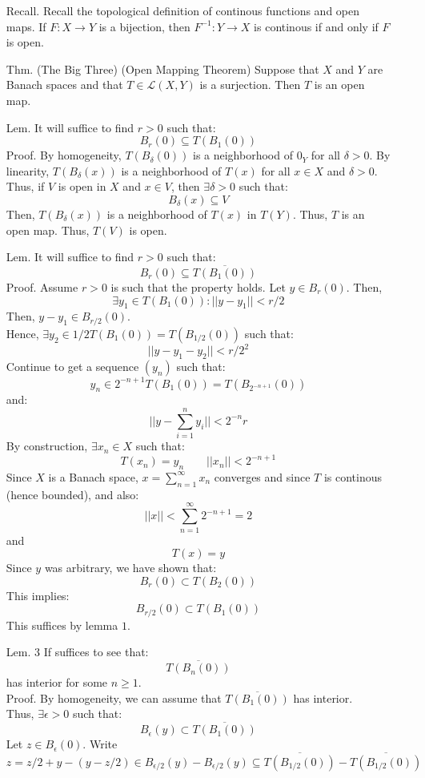 \documentclass[12pt]{article}
\begin{document}
\begin{itemize}
    \item[Recall.]  Recall the topological definition of continous functions and open maps. If $F: X\to Y$ is a bijection, then $F^{-1}: Y \to X$ is continous if and only if $F$ is open.
    \item[Thm.] (The Big Three) (Open Mapping Theorem) Suppose that $X$ and $Y$ are Banach spaces and that $T \in \mathcal{L}(X,Y)$ is a surjection. Then $T$ is an open map.
    \item[Lem.] It will suffice to find $r > 0$ such that: 
    \[ B_r(0) \subseteq T(B_1(0)) \]
    Proof. By homogeneity, $T(B_\delta(0))$ is a neighborhood of $0_Y$ for all $\delta > 0$. By linearity, $T(B_\delta(x))$ is a neighborhood of $T(x)$ for all $x \in X$ and $\delta > 0$. Thus, if $V$ is open in $X$ and $x \in V$, then $\exists \delta > 0$ such that:
    \[ B_\delta(x) \subseteq V\]
    Then, $T(B_\delta(x))$ is a neighborhood of $T(x)$ in $T(Y)$. Thus, $T$ is an open map. Thus, $T(V)$ is open.
    \item[Lem.] It will suffice to find $r > 0$ such that: 
    \[ B_r(0) \subseteq \overline{T(B_1(0))}\]
    Proof. Assume $r > 0$ is such that the property holds. Let $y \in B_r(0)$. Then, 
    \[ \exists y_1 \in T(B_1(0)): ||y-y_1|| < r/2\]
    Then, $y-y_1 \in B_{r/2}(0)$. \\
    Hence, $\exists y_2 \in 1/2T(B_1(0)) = T(B_{1/2}(0))$ such that: 
    \[ || y- y_1 -y_2|| < r/2^2\]
    Continue to get a sequence $(y_n)$ such that: 
    \[y_n \in 2^{-n+1}T(B_1(0)) = T(B_{2^{-n+1}}(0))\]
    and: 
    \[||y - \sum_{i = 1}^n y_i|| < 2^{-n}r\]
    By construction, $\exists x_n \in X$ such that:
    \[ T(x_n) = y_n \qquad ||x_n|| < 2^{-n+1} \]
    Since $X$ is a Banach space, $x = \sum_{n=1}^\infty x_n$ converges and since $T$ is continous (hence bounded), and also: 
    \[ ||x|| < \sum_{n = 1}^\infty 2^{-n+1} = 2 \]
    and
    \[T(x) = y\] 
    Since $y$ was arbitrary, we have shown that:
    \[B_r(0) \subset T(B_2(0))\]
    This implies: 
    \[ B_{r/2}(0) \subset T(B_1(0)) \]
    This suffices by lemma $1$.
    \item[Lem. 3] If suffices to see that: 
    \[ \overline{T(B_n(0))}\] 
    has interior for some $n \geq 1$. \\
    Proof. By homogeneity, we can assume that $\overline{T(B_1(0))}$ has interior. \\
    Thus, $\exists \epsilon > 0$ such that: 
    \[B_\epsilon(y) \subset \overline{T(B_1(0))} \]
    Let $z \in B_\epsilon(0)$. Write
    \[ z = z/2 + y - (y-z/2) \in B_{\epsilon/2}(y)-B_{\epsilon/2}(y) \subseteq \overline{T(B_{1/2}(0))}- \overline{T(B_{1/2}(0))}\]

\end{itemize}
\end{document}
